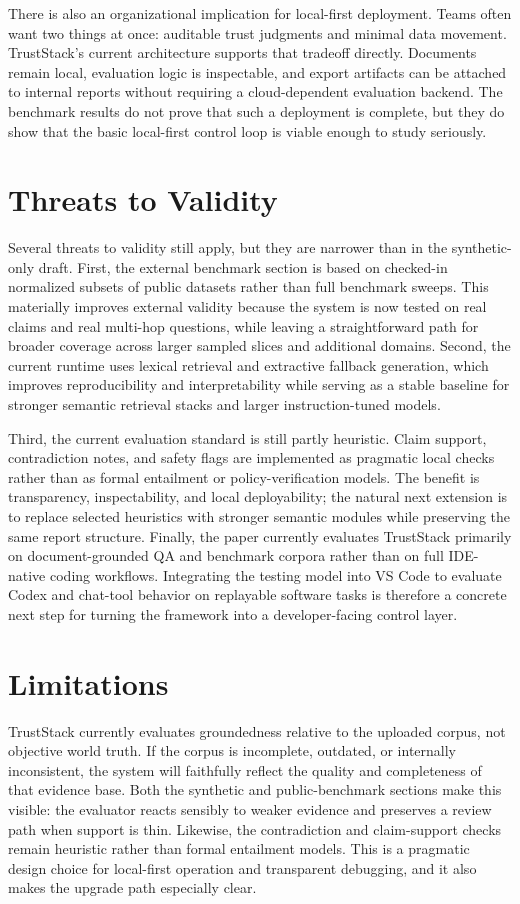 \documentclass[conference]{IEEEtran}
\newcommand{\TrustSection}[1]{\section{\texorpdfstring{\textcolor{TrustStackBlue}{#1}}{#1}}}
\begin{document}
There is also an organizational implication for local-first deployment. Teams often want two things at once: auditable trust judgments and minimal data movement. TrustStack's current architecture supports that tradeoff directly. Documents remain local, evaluation logic is inspectable, and export artifacts can be attached to internal reports without requiring a cloud-dependent evaluation backend. The benchmark results do not prove that such a deployment is complete, but they do show that the basic local-first control loop is viable enough to study seriously.

\TrustSection{Threats to Validity}
Several threats to validity still apply, but they are narrower than in the synthetic-only draft. First, the external benchmark section is based on checked-in normalized subsets of public datasets rather than full benchmark sweeps. This materially improves external validity because the system is now tested on real claims and real multi-hop questions, while leaving a straightforward path for broader coverage across larger sampled slices and additional domains. Second, the current runtime uses lexical retrieval and extractive fallback generation, which improves reproducibility and interpretability while serving as a stable baseline for stronger semantic retrieval stacks and larger instruction-tuned models.

Third, the current evaluation standard is still partly heuristic. Claim support, contradiction notes, and safety flags are implemented as pragmatic local checks rather than as formal entailment or policy-verification models. The benefit is transparency, inspectability, and local deployability; the natural next extension is to replace selected heuristics with stronger semantic modules while preserving the same report structure. Finally, the paper currently evaluates TrustStack primarily on document-grounded QA and benchmark corpora rather than on full IDE-native coding workflows. Integrating the testing model into VS Code to evaluate Codex and chat-tool behavior on replayable software tasks is therefore a concrete next step for turning the framework into a developer-facing control layer.

\TrustSection{Limitations}
TrustStack currently evaluates groundedness relative to the uploaded corpus, not objective world truth. If the corpus is incomplete, outdated, or internally inconsistent, the system will faithfully reflect the quality and completeness of that evidence base. Both the synthetic and public-benchmark sections make this visible: the evaluator reacts sensibly to weaker evidence and preserves a review path when support is thin. Likewise, the contradiction and claim-support checks remain heuristic rather than formal entailment models. This is a pragmatic design choice for local-first operation and transparent debugging, and it also makes the upgrade path especially clear.
\end{document}
